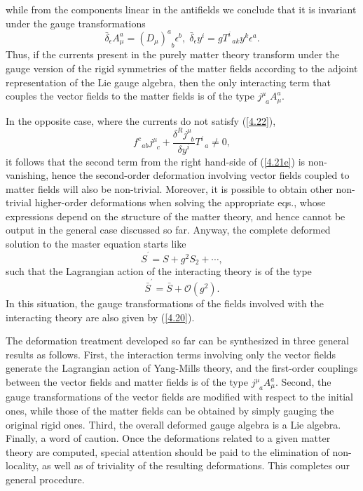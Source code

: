 \documentclass[a4paper,12pt]{article}
\begin{document}
while from the components linear in the
antifields we conclude that it is
invariant under the gauge transformations
\begin{equation}
\bar{\delta}_{\epsilon }A_{\mu }^{a}=
\left( D_{\mu }\right)
_{\;\;b}^{a}\epsilon ^{b},\;\bar{\delta}_{\epsilon
}y^{i}=gT_{\;\;ak}^{i}y^{k}\epsilon ^{a}.  \label{4.20}
\end{equation}
Thus, if the currents present in the purely
matter theory transform under
the gauge version of the rigid symmetries of
the matter fields according to
the adjoint representation of the Lie gauge
algebra, then the only
interacting term that couples the vector
fields to the matter fields is of
the type $j_{\;\;a}^{\mu }A_{\mu }^{a}$.

In the opposite case, where the currents do
not satisfy (\ref{4.22}),
\begin{equation}
f_{\;\;ab}^{c}j_{\;\;c}^{\mu }+
\frac{\delta ^{R}j_{\;\;b}^{\mu }}{\delta
y^{i}}T_{\;\;a}^{i}\neq 0,  \label{4.25}
\end{equation}
it follows that the second term from the
right hand-side of (\ref{4.21e}) is
non-vanishing, hence the second-order
deformation involving vector fields
coupled to matter fields will also be
non-trivial. Moreover, it is possible
to obtain other non-trivial higher-order
deformations when solving the
appropriate eqs., whose expressions
depend on the structure of the matter
theory, and hence cannot be output in
the general case discussed so far.
Anyway, the complete deformed solution
to the master equation starts like
\begin{equation}
S^{^{\prime }}=S+g^{2}S_{2}+\cdots ,  \label{4.26}
\end{equation}
such that the Lagrangian action of the
interacting theory is of the type
\begin{equation}
\bar{S}^{^{\prime }}=\bar{S}+
{\mathcal{O}}\left( g^{2}\right) .  \label{4.27}
\end{equation}
In this situation, the gauge
transformations of the fields involved with the
interacting theory are also given by
(\ref{4.20}).

The deformation treatment developed so
far can be synthesized in three
general results as follows. First, the
interaction terms involving only the
vector fields generate the Lagrangian
action of Yang-Mills theory, and the
first-order couplings between the vector
fields and matter fields is of the
type $j_{\;\;a}^{\mu }A_{\mu }^{a}$.
Second, the gauge transformations of
the vector fields are modified with
respect to the initial ones, while those
of the matter fields can be obtained by
simply gauging the original rigid
ones. Third, the overall deformed gauge
algebra is a Lie algebra. Finally, a
word of caution. Once the deformations
related to a given matter theory are
computed, special attention should be
paid to the elimination of
non-locality, as well as of triviality
of the resulting deformations. This
completes our general procedure.
\end{document}
